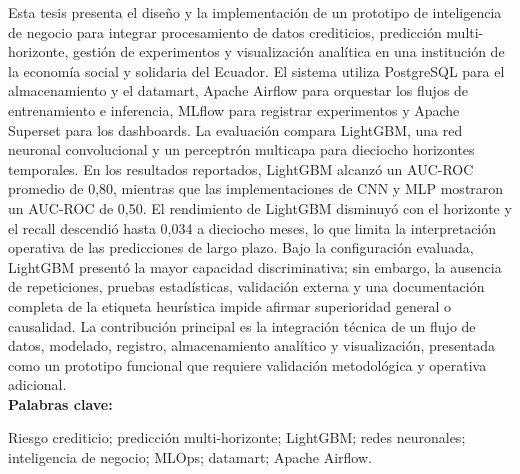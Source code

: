 Esta tesis presenta el diseño y la implementación de un prototipo de inteligencia de negocio para integrar procesamiento de datos crediticios, predicción multi-horizonte, gestión de experimentos y visualización analítica en una institución de la economía social y solidaria del Ecuador. El sistema utiliza PostgreSQL para el almacenamiento y el datamart, Apache Airflow para orquestar los flujos de entrenamiento e inferencia, MLflow para registrar experimentos y Apache Superset para los dashboards. La evaluación compara LightGBM, una red neuronal convolucional y un perceptrón multicapa para dieciocho horizontes temporales. En los resultados reportados, LightGBM alcanzó un AUC-ROC promedio de 0,80, mientras que las implementaciones de CNN y MLP mostraron un AUC-ROC de 0,50. El rendimiento de LightGBM disminuyó con el horizonte y el recall descendió hasta 0,034 a dieciocho meses, lo que limita la interpretación operativa de las predicciones de largo plazo. Bajo la configuración evaluada, LightGBM presentó la mayor capacidad discriminativa; sin embargo, la ausencia de repeticiones, pruebas estadísticas, validación externa y una documentación completa de la etiqueta heurística impide afirmar superioridad general o causalidad. La contribución principal es la integración técnica de un flujo de datos, modelado, registro, almacenamiento analítico y visualización, presentada como un prototipo funcional que requiere validación metodológica y operativa adicional.\\

\noindent\textbf{Palabras clave:}

Riesgo crediticio; predicción multi-horizonte; LightGBM; redes neuronales; inteligencia de negocio; MLOps; datamart; Apache Airflow.